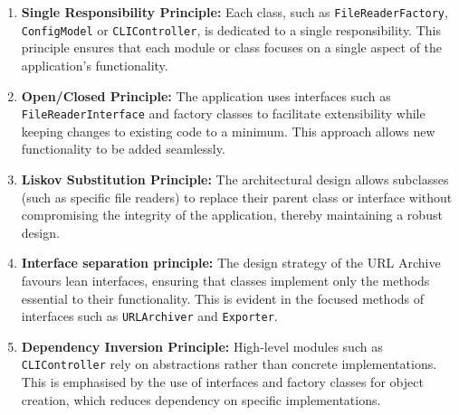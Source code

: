 \begin{enumerate}
	\item \textbf{Single Responsibility Principle:} Each class, such as \texttt{FileReaderFactory}, \texttt{ConfigModel} or \texttt{CLIController}, is dedicated to a single responsibility. This principle ensures that each module or class focuses on a single aspect of the application's functionality.
	\item \textbf{Open/Closed Principle:} The application uses interfaces such as \texttt{FileReaderInterface} and factory classes to facilitate extensibility while keeping changes to existing code to a minimum. This approach allows new functionality to be added seamlessly.
	\item \textbf{Liskov Substitution Principle:} The architectural design allows subclasses (such as specific file readers) to replace their parent class or interface without compromising the integrity of the application, thereby maintaining a robust design.
	\item \textbf{Interface separation principle:} The design strategy of the URL Archive favours lean interfaces, ensuring that classes implement only the methods essential to their functionality. This is evident in the focused methods of interfaces such as \texttt{URLArchiver} and \texttt{Exporter}.
	\item \textbf{Dependency Inversion Principle:} High-level modules such as \texttt{CLIController} rely on abstractions rather than concrete implementations. This is emphasised by the use of interfaces and factory classes for object creation, which reduces dependency on specific implementations.
\end{enumerate}

